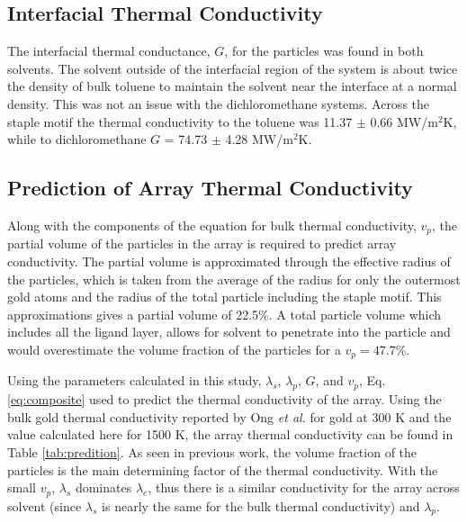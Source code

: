 \subsection{Interfacial Thermal Conductivity}
The interfacial thermal conductance, $G$, for the particles was found in both solvents.
The solvent outside of the interfacial region of the system is about twice the density of bulk toluene to maintain the solvent near the interface at a normal density.
This was not an issue with the dichloromethane systems. 
Across the staple motif the thermal conductivity to the toluene was 11.37 $\pm$ 0.66 MW/m$^2$K, while to dichloromethane $G$ = 74.73 $\pm$ 4.28 MW/m$^2$K.

\subsection{Prediction of Array Thermal Conductivity}
Along with the components of the equation for bulk thermal conductivity, $v_p$, the partial volume of the  particles in the array is required to predict array conductivity.
The partial volume is approximated through the effective radius of the particles, which is taken from the average of the radius for only the outermost gold atoms and the radius of the total particle including the staple motif.
This approximations gives a partial volume of 22.5\%.
A total particle volume which includes all the ligand layer, allows for solvent to penetrate into the particle and would overestimate the volume fraction of the particles for a $v_p = 47.7\%$.

Using the parameters calculated in this study, $\lambda_s$, $\lambda_p$, $G$, and $v_p$, Eq.\ref{eq:composite} used to predict the thermal conductivity of the array.
Using the bulk gold thermal conductivity reported by Ong \textit{et al.} for gold at 300 K and the value calculated here for 1500 K, the array thermal conductivity can be found in Table \ref{tab:predition}.
As seen in previous work,\cite{Ong:2014yq, Liu2015, Zanjani2014} the volume fraction of the particles is the main determining factor of the thermal conductivity. 
With the small $v_p$, $\lambda_s$ dominates $\lambda_e$, thus there is a similar conductivity for the array across solvent (since $\lambda_s$ is nearly the same for the bulk thermal conductivity) and $\lambda_p$.

